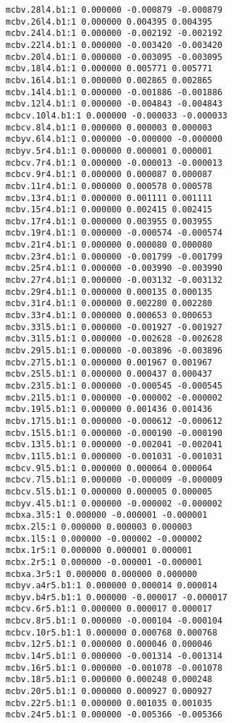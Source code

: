 \begin{verbatim}
mcbv.28l4.b1:1 0.000000 -0.000879 -0.000879
mcbv.26l4.b1:1 0.000000 0.004395 0.004395
mcbv.24l4.b1:1 0.000000 -0.002192 -0.002192
mcbv.22l4.b1:1 0.000000 -0.003420 -0.003420
mcbv.20l4.b1:1 0.000000 -0.003095 -0.003095
mcbv.18l4.b1:1 0.000000 0.005771 0.005771
mcbv.16l4.b1:1 0.000000 0.002865 0.002865
mcbv.14l4.b1:1 0.000000 -0.001886 -0.001886
mcbv.12l4.b1:1 0.000000 -0.004843 -0.004843
mcbcv.10l4.b1:1 0.000000 -0.000033 -0.000033
mcbcv.8l4.b1:1 0.000000 0.000003 0.000003
mcbyv.6l4.b1:1 0.000000 -0.000000 -0.000000
mcbyv.5r4.b1:1 0.000000 0.000001 0.000001
mcbcv.7r4.b1:1 0.000000 -0.000013 -0.000013
mcbcv.9r4.b1:1 0.000000 0.000087 0.000087
mcbv.11r4.b1:1 0.000000 0.000578 0.000578
mcbv.13r4.b1:1 0.000000 0.001111 0.001111
mcbv.15r4.b1:1 0.000000 0.002415 0.002415
mcbv.17r4.b1:1 0.000000 0.003955 0.003955
mcbv.19r4.b1:1 0.000000 -0.000574 -0.000574
mcbv.21r4.b1:1 0.000000 0.000080 0.000080
mcbv.23r4.b1:1 0.000000 -0.001799 -0.001799
mcbv.25r4.b1:1 0.000000 -0.003990 -0.003990
mcbv.27r4.b1:1 0.000000 -0.003132 -0.003132
mcbv.29r4.b1:1 0.000000 0.000135 0.000135
mcbv.31r4.b1:1 0.000000 0.002280 0.002280
mcbv.33r4.b1:1 0.000000 0.000653 0.000653
mcbv.33l5.b1:1 0.000000 -0.001927 -0.001927
mcbv.31l5.b1:1 0.000000 -0.002628 -0.002628
mcbv.29l5.b1:1 0.000000 -0.003896 -0.003896
mcbv.27l5.b1:1 0.000000 0.001967 0.001967
mcbv.25l5.b1:1 0.000000 0.000437 0.000437
mcbv.23l5.b1:1 0.000000 -0.000545 -0.000545
mcbv.21l5.b1:1 0.000000 -0.000002 -0.000002
mcbv.19l5.b1:1 0.000000 0.001436 0.001436
mcbv.17l5.b1:1 0.000000 -0.000612 -0.000612
mcbv.15l5.b1:1 0.000000 -0.000190 -0.000190
mcbv.13l5.b1:1 0.000000 -0.002041 -0.002041
mcbv.11l5.b1:1 0.000000 -0.001031 -0.001031
mcbcv.9l5.b1:1 0.000000 0.000064 0.000064
mcbcv.7l5.b1:1 0.000000 -0.000009 -0.000009
mcbcv.5l5.b1:1 0.000000 0.000005 0.000005
mcbyv.4l5.b1:1 0.000000 -0.000002 -0.000002
mcbxa.3l5:1 0.000000 -0.000001 -0.000001
mcbx.2l5:1 0.000000 0.000003 0.000003
mcbx.1l5:1 0.000000 -0.000002 -0.000002
mcbx.1r5:1 0.000000 0.000001 0.000001
mcbx.2r5:1 0.000000 -0.000001 -0.000001
mcbxa.3r5:1 0.000000 0.000000 0.000000
mcbyv.a4r5.b1:1 0.000000 0.000014 0.000014
mcbyv.b4r5.b1:1 0.000000 -0.000017 -0.000017
mcbcv.6r5.b1:1 0.000000 0.000017 0.000017
mcbcv.8r5.b1:1 0.000000 -0.000104 -0.000104
mcbcv.10r5.b1:1 0.000000 0.000768 0.000768
mcbv.12r5.b1:1 0.000000 0.000046 0.000046
mcbv.14r5.b1:1 0.000000 -0.001314 -0.001314
mcbv.16r5.b1:1 0.000000 -0.001078 -0.001078
mcbv.18r5.b1:1 0.000000 0.000248 0.000248
mcbv.20r5.b1:1 0.000000 0.000927 0.000927
mcbv.22r5.b1:1 0.000000 0.001035 0.001035
mcbv.24r5.b1:1 0.000000 -0.005366 -0.005366

\end{verbatim}
